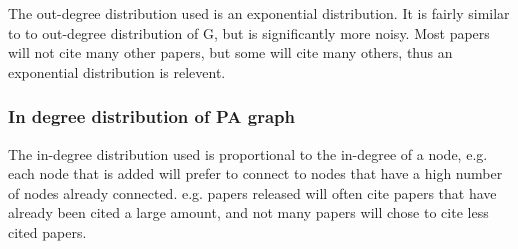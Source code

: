 \documentclass{article}
\begin{document}

The out-degree distribution used is an exponential distribution. It is fairly similar to to out-degree distribution of G, but is significantly more noisy.
Most papers will not cite many other papers, but some will cite many others, thus an exponential distribution is relevent.

\subsubsection{In degree distribution of PA graph}


The in-degree distribution used is proportional to the in-degree of a node, e.g. each node that is added will prefer to connect to nodes that have a high number of nodes already connected.
e.g. papers released will often cite papers that have already been cited a large amount, and not many papers will chose to cite less cited papers.
\end{document}
